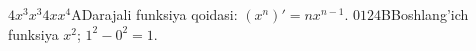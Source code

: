   {$4x^3$}{$x^3$}{$4x$}{$x^4$}{A}{Darajali funksiya qoidasi: $(x^n)'=nx^{n-1}$.}
  {$0$}{$1$}{$2$}{$4$}{B}{Boshlang'ich funksiya $x^2$; $1^2-0^2=1$.}
